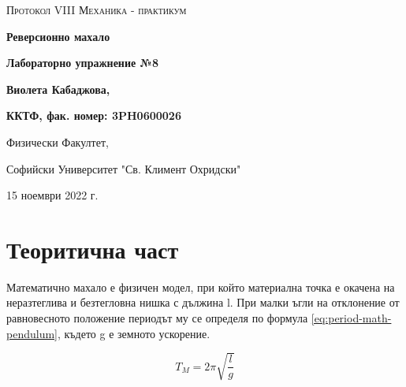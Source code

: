 \documentclass[12pt]{article}
\begin{document}
\begin{titlepage}
	\flushleft
	{\scshape\Large Протокол VIII \hspace{1.5cm} Механика - практикум\par}
	\vspace{5cm}
	{\huge\bfseries Реверсионно махало\par}
	\vspace{1cm}
	{\LARGE\bfseries Лабораторно упражнение №8\par}
	\vspace{5cm}
    {\LARGE\bfseries Виолета Кабаджова, \par}
    {\large\bfseries ККТФ, фак. номер: 3PH0600026\par}
	\vspace{1cm}
	
	{\large Физически Факултет, 
	
	Софийски Университет "Св. Климент Охридски"
	
	15 ноември 2022 г.\par}
	
\end{titlepage}

\section{Теоритична част}\label{sec:theoretical-part}

Математично махало е физичен модел, при който материална точка е окачена на неразтеглива и безтегловна нишка с дължина l. При малки ъгли на отклонение от равновесното положение периодът му се определя по формула \ref{eq:period-math-pendulum}, където g е земното ускорение.

\begin{equation}\label{eq:period-math-pendulum}
    T_M = 2 \pi \sqrt{\frac{l}{g}}
\end{equation}
\end{document}

